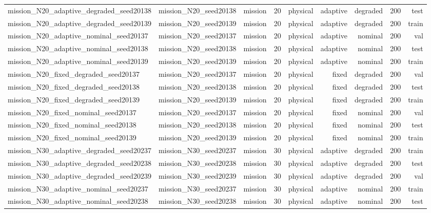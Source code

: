 \begin{tabular}{lrrrrrrrr}
mission\_N20\_adaptive\_degraded\_seed20138 & mission\_N20\_seed20138 & mission & 20 & physical & adaptive & degraded & 200 & test \\
mission\_N20\_adaptive\_degraded\_seed20139 & mission\_N20\_seed20139 & mission & 20 & physical & adaptive & degraded & 200 & train \\
mission\_N20\_adaptive\_nominal\_seed20137 & mission\_N20\_seed20137 & mission & 20 & physical & adaptive & nominal & 200 & val \\
mission\_N20\_adaptive\_nominal\_seed20138 & mission\_N20\_seed20138 & mission & 20 & physical & adaptive & nominal & 200 & test \\
mission\_N20\_adaptive\_nominal\_seed20139 & mission\_N20\_seed20139 & mission & 20 & physical & adaptive & nominal & 200 & train \\
mission\_N20\_fixed\_degraded\_seed20137 & mission\_N20\_seed20137 & mission & 20 & physical & fixed & degraded & 200 & val \\
mission\_N20\_fixed\_degraded\_seed20138 & mission\_N20\_seed20138 & mission & 20 & physical & fixed & degraded & 200 & test \\
mission\_N20\_fixed\_degraded\_seed20139 & mission\_N20\_seed20139 & mission & 20 & physical & fixed & degraded & 200 & train \\
mission\_N20\_fixed\_nominal\_seed20137 & mission\_N20\_seed20137 & mission & 20 & physical & fixed & nominal & 200 & val \\
mission\_N20\_fixed\_nominal\_seed20138 & mission\_N20\_seed20138 & mission & 20 & physical & fixed & nominal & 200 & test \\
mission\_N20\_fixed\_nominal\_seed20139 & mission\_N20\_seed20139 & mission & 20 & physical & fixed & nominal & 200 & train \\
mission\_N30\_adaptive\_degraded\_seed20237 & mission\_N30\_seed20237 & mission & 30 & physical & adaptive & degraded & 200 & train \\
mission\_N30\_adaptive\_degraded\_seed20238 & mission\_N30\_seed20238 & mission & 30 & physical & adaptive & degraded & 200 & test \\
mission\_N30\_adaptive\_degraded\_seed20239 & mission\_N30\_seed20239 & mission & 30 & physical & adaptive & degraded & 200 & val \\
mission\_N30\_adaptive\_nominal\_seed20237 & mission\_N30\_seed20237 & mission & 30 & physical & adaptive & nominal & 200 & train \\
mission\_N30\_adaptive\_nominal\_seed20238 & mission\_N30\_seed20238 & mission & 30 & physical & adaptive & nominal & 200 & test \\

\end{tabular}
